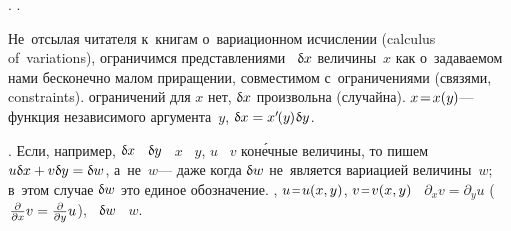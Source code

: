 

\label{para:calculusofvariations}






\begin{otherlanguage}{russian}

\en{,}
.
.

Не~отсылая читателя
к~книгам о~вариационном исчислении
(calculus of~variations),
ограничимся представлениями
~$\updelta\hspace{-0.1ex}x$
величины~$x$
как о~задаваемом нами
бесконечно малом приращении,
совместимом с~ограничениями
(связями, constraints).
ограничений для $x$ нет,
\en{}
${\updelta\hspace{-0.1ex}x}$
произвольна
(случайна).
${x \!=\! x(y\hspace{-0.1ex})}$\:---
функция независимого аргумента~$y$,
${\updelta\hspace{-0.1ex}x = x'\hspace{-0.25ex}(y\hspace{-0.1ex}) \hspace{.1ex} \updelta\hspace{-0.1ex}y}$.

\ru{,}   .
Если, например, ${\updelta\hspace{-0.1ex}x}$ ~${\updelta\hspace{-0.1ex}y}$\ru{\:---} ~$x$ ~$y$, $u$ ~$v$\ru{\:---} кон\'{е}чные величины, то пишем ${u \updelta\hspace{-0.1ex}x + v \updelta\hspace{-0.1ex}y = \updelta\hspace{-0.1ex}w}$, а~не~$w$\:--- даже когда ${\updelta\hspace{-0.1ex}w}$ не~является вариацией величины~$w$; в~этом случае ${\updelta\hspace{-0.1ex}w}$ это единое обозначение.
,  ${u \narroweq u(x,y)}$, ${v \narroweq v(x,y)}$ ~${\partial_x v = \partial_y u}$ (${\hspace{.16ex}\frac{\partial}{\partial x} v = \frac{\partial}{\partial y} u\hspace{.16ex}}$),  ~${\updelta\hspace{-0.1ex}w}$  ~$w$.


\end{otherlanguage}
